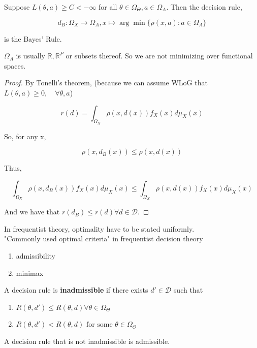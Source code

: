 \documentclass[11pt,fleqn]{book} %
\begin{document}
\begin{theorem}[1.7 in Notes]
	Suppose $L(\theta ,a) \geq C < - \infty$ for all $\theta \in \Omega_\Theta, a \in \Omega_A$. Then the decision rule,  

			$$d_B: \Omega_X \rightarrow \Omega_A, x \mapsto \arg\min \{\rho(x, a): a \in \Omega_A \} $$

	is the Bayes' Rule. 
\end{theorem}

$\Omega_A$ is usually $\mathbb{R}, \mathbb{R}^P$ or subsets thereof. So we are not minimizing over functional spaces. 

\begin{proof}
	By Tonelli's theorem, (because we can assume WLoG that $L(\theta, a) \geq 0, \quad \forall \theta, a$) 

			 $$r(d) = \int_{\Omega_X} \rho (x, d(x)) f_X(x) d \mu_X(x)$$

So, for any x, 

		$$\rho (x, d_B(x)) \leq \rho (x, d(x)) $$

Thus, 

		$$  \int_{\Omega_X} \rho (x, d_B(x)) f_X(x) d \mu_X(x) \leq \int_{\Omega_X} \rho (x, d(x)) f_X(x) d \mu_X(x)$$

And we have that $r(d_B) \leq r(d) \forall d \in \mathcal{D}$. 
\end{proof}

In frequentist theory, optimality have to be stated uniformly. \\

"Commonly used optimal criteria" in frequentist decision theory 

		\begin{enumerate}
			\item admissibility
			\item minimax 
		\end{enumerate}

\begin{definition}
	A decision rule is \textbf{inadmissible} if there exists $d' \in \mathcal{D}$ such that 

		\begin{enumerate}
			\item $R(\theta, d') \leq R(\theta, d) \forall \theta \in \Omega_\Theta$
			\item  $R(\theta, d') < R(\theta, d) \text{ for some } \theta \in \Omega_\Theta$
		\end{enumerate}

A decision rule that is not inadmissible is admissible. 
\end{definition}
\end{document}
